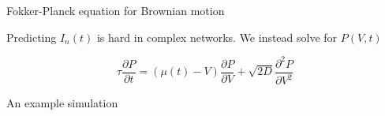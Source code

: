 \documentclass[aspectratio=169]{beamer}
\begin{document}
\begin{frame}{Fokker-Planck equation for Brownian motion}

\begin{figure}
\centering
{}
\end{figure}

Predicting $I_{n}(t)$ is hard in complex networks. We instead solve for $P(V,t)$

\begin{equation*}
\tau\frac{\partial P}{\partial t} = (\mu(t)-V)\frac{\partial P}{\partial V} + \sqrt{2D}\frac{\partial^{2}P}{\partial V^{2}}
\end{equation*}

\end{frame}

\begin{frame}{An example simulation}



\end{frame}
\end{document}
